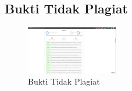 \subsection{Bukti Tidak Plagiat}
\begin{figure}[H]
	\includegraphics[width=4cm]{figures/1174074/5/plagiat.jpg}
	\centering
	\caption{Bukti Tidak Plagiat}
\end{figure}
